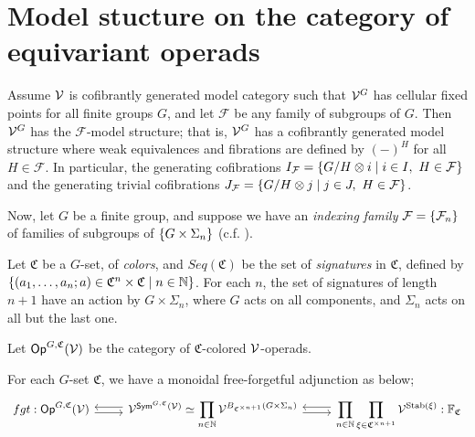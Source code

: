 \documentclass[psamsfonts,onesided,10pt,letterpaper]{amsart}%
\renewcommand{\C}{\ensuremath{\mathfrak{C}}}
\renewcommand{\F}{\mathcal F}
\newcommand{\FF}{\ensuremath{\mathbb{F}}}
\renewcommand{\1}{\ensuremath{\mathbb{id}}}
\newcommand{\N}{\mathbb N}
\begin{document}
\newpage
\section{Model stucture on the category of equivariant operads}

\begin{proposition}
  Assume $\mathcal V$ is cofibrantly generated model category such that $\mathcal V^G$ has cellular fixed points for all finite groups $G$, and let $\F$ be any family of subgroups of $G$. Then $\mathcal V^G$ has the $\F$-model structure; that is, $\mathcal V^G$ has a cofibrantly generated model structure where weak equivalences and fibrations are defined by $(-)^H$ for all $H\in \F$. In particular, the generating cofibrations $I_\F = \sets{G/H\otimes i}{i\in I,\ H\in \F}$ and the generating trivial cofibrations $J_\F = \sets{G/H\otimes j}{j\in J,\ H\in \F}$. 
\end{proposition}

Now, let $G$ be a finite group, and suppose we have an {\em indexing family} $\F = \set{\F_n}$ of families of subgroups of $\left\{G\times \Sigma_n\right\}$ (c.f. \cite{BH15}). 

Let $\C$ be a $G$-set, of {\em colors}, and $Seq(\C)$ be the set of {\em signatures} in $\C$, defined by
$\sets{
  (a_1,\ldots, a_n; a)\in \C^n\times\C
}
{n\in\mathbb{N}}$.
For each $n$, the set of signatures of length $n+1$ have an action by $G\times \Sigma_n$, where $G$ acts on all components, and $\Sigma_n$ acts on all but the last one. 


\begin{definition}
  Let $\mathsf{Op}^{G,\mathfrak C}(\mathcal V)$ be the category of $\C$-colored $\mathcal V$-operads.
\end{definition}

For each $G$-set $\C$, we have a monoidal free-forgetful adjunction as below;
\begin{equation}
      \begin{tikzcd}
            fgt: \Op^{G,\mathfrak C}(\V) \arrow[r, shift right]
            &
            \V^{\Sym^{G,\mathfrak C}(\V)} \simeq
            \displaystyle\prod_{n \in \N} \V^{B_{\mathfrak C^{\times n+1}}(G \times \Sigma_n)}
            \arrow[l, shift right]
            \arrow[r, shift right]
            &
            \displaystyle\prod_{n\in\N}\displaystyle\prod_{\ksi\in \C^{\times n+1}}\V^{\Stab(\ksi)}
            \arrow[l, shift right]
            : \FF_\C
      \end{tikzcd}
\end{equation}
\end{document}
